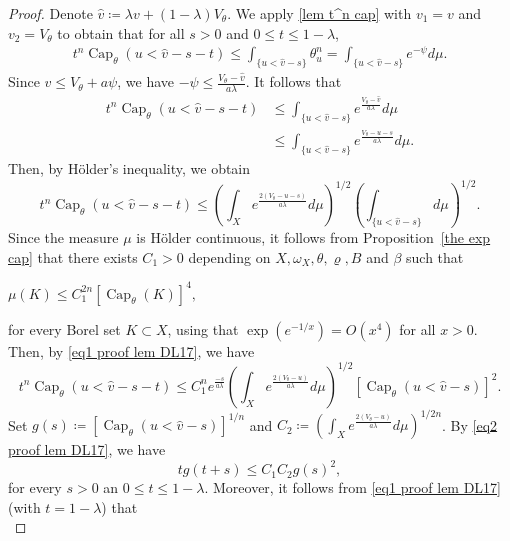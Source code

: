 \documentclass[a4paper,11pt]{amsart}
\numberwithin{equation}{section}
\theoremstyle{definition}
\newcommand{\capacity}{\mathop{\mathrm{Cap}}\nolimits}
\begin{document}
\begin{proof}
	Denote $\widehat{v}\coloneqq \lambda v+(1-\lambda) V_{\theta}$.
	 We apply \ref{lem t^n cap} with $v_1=v$ and $v_2=V_\theta$ to obtain that for all $s>0$ and $0\leq t\leq 1-\lambda$,
	\begin{align*}
		t^n\capacity_{\theta}(u<\widehat{v}-s-t)\leq \int_{\{u<\widehat{v}-s\}}\theta_u^n
		=\int_{\{u<\widehat{v}-s\}}e^{-\psi}d\mu.
	\end{align*}
Since $v\leq V_{\theta}+a\psi$, we have $-\psi\leq \frac{V_\theta-\widehat v}{a\lambda}$.
It follows that
\begin{align*}
t^n\capacity_{\theta}(u<\widehat{v}-s-t)&\leq \int_{\{u<\widehat{v}-s\}}e^{\frac{V_{\theta}-\widehat{v}}{a\lambda}}d\mu\\
&\leq \int_{\{u<\widehat{v}-s\}}e^{\frac{V_{\theta}-u-s}{a\lambda}}d\mu.
\end{align*}
Then, by H\"older's inequality, we obtain
\begin{equation}\label{eq1 proof lem DL17}
t^n\capacity_{\theta}(u<\widehat{v}-s-t)\leq 
\left( \int_{X}e^{\frac{2(V_{\theta}-u-s)}{a\lambda}}d\mu\right)^{{1}/{2}}
\left( \int_{\{u<\widehat{v}-s\}}d\mu\right)^{{1}/{2}}.
\end{equation}
Since the measure $\mu$ is H\"older continuous, it follows from Proposition~\ref{the exp cap} that there exists $C_1>0$
depending on $X, \omega_X, \theta, \varrho, B$ and  $\beta$ such that
\begin{center}
	$\mu(K)\leq C_1^{2n} [\capacity_{\theta}(K)]^4,$
\end{center}
for every Borel set $K\subset X$, using that $\exp(e^{-1/x})=O(x^4)$ for all $x>0$. 
Then, by \eqref{eq1 proof lem DL17}, we have
\begin{equation}\label{eq2 proof lem DL17}
t^n\capacity_{\theta}(u<\widehat{v}-s-t)\leq C_1^n e^{\frac{-s}{a\lambda}}\left( \int_{X}e^{\frac{2(V_{\theta}-u)}{a\lambda}}d\mu\right)^{{1}/{2}}
[\capacity_{\theta}(u<\widehat{v}-s)]^2.
\end{equation}
Set $g(s)\coloneqq[\capacity_{\theta}(u<\widehat{v}-s)]^{1/n}$ and
 $C_2\coloneqq\left(\int_{X}e^{\frac{2(V_{\theta}-u)}{a\lambda}}d\mu\right)^{{1}/{2n}}$.
  By \eqref{eq2 proof lem DL17},
 we have
 \begin{equation}\label{eq3 proof lem DL17}
 	tg(t+s)\leq C_1C_2g(s)^2,
 \end{equation}
for every $s>0$ an $0\leq t\leq 1-\lambda$. Moreover, it follows from \eqref{eq1 proof lem DL17} (with $t=1-\lambda$) that
\begin{equation}\label{eq4 proof lem DL17}

\end{equation}
\end{proof}
\end{document}
